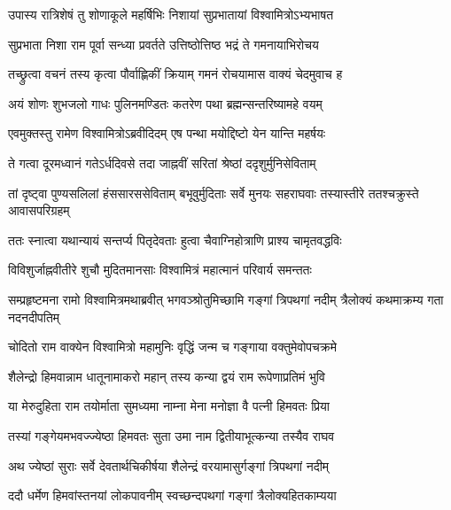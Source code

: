 
\twolineshloka
{उपास्य रात्रिशेषं तु शोणाकूले महर्षिभिः}
{निशायां सुप्रभातायां विश्वामित्रोऽभ्यभाषत} %

\twolineshloka
{सुप्रभाता निशा राम पूर्वा सन्ध्या प्रवर्तते}
{उत्तिष्ठोत्तिष्ठ भद्रं ते गमनायाभिरोचय} %

\twolineshloka
{तच्छ्रुत्वा वचनं तस्य कृत्वा पौर्वाह्णिकीं क्रियाम्}
{गमनं रोचयामास वाक्यं चेदमुवाच ह} %

\twolineshloka
{अयं शोणः शुभजलो गाधः पुलिनमण्डितः}
{कतरेण पथा ब्रह्मन्सन्तरिष्यामहे वयम्} %

\twolineshloka
{एवमुक्तस्तु रामेण विश्वामित्रोऽब्रवीदिदम्}
{एष पन्था मयोद्दिष्टो येन यान्ति महर्षयः} %

\twolineshloka
{ते गत्वा दूरमध्वानं गतेऽर्धदिवसे तदा}
{जाह्नवीं सरितां श्रेष्ठां ददृशुर्मुनिसेविताम्} %

\threelineshloka
{तां दृष्ट्वा पुण्यसलिलां हंससारससेविताम्}
{बभूवुर्मुदिताः सर्वे मुनयः सहराघवाः}
{तस्यास्तीरे ततश्चक्रुस्ते आवासपरिग्रहम्} %

\twolineshloka
{ततः स्नात्वा यथान्यायं सन्तर्प्य पितृदेवताः}
{हुत्वा चैवाग्निहोत्राणि प्राश्य चामृतवद्धविः} %

\twolineshloka
{विविशुर्जाह्नवीतीरे शुचौ मुदितमानसाः}
{विश्वामित्रं महात्मानं परिवार्य समन्ततः} %

\threelineshloka
{सम्प्रहृष्टमना रामो विश्वामित्रमथाब्रवीत्}
{भगवञ्श्रोतुमिच्छामि गङ्गां त्रिपथगां नदीम्}
{त्रैलोक्यं कथमाक्रम्य गता नदनदीपतिम्} %

\twolineshloka
{चोदितो राम वाक्येन विश्वामित्रो महामुनिः}
{वृद्धिं जन्म च गङ्गाया वक्तुमेवोपचक्रमे} %

\twolineshloka
{शैलेन्द्रो हिमवान्नाम धातूनामाकरो महान्}
{तस्य कन्या द्वयं राम रूपेणाप्रतिमं भुवि} %

\twolineshloka
{या मेरुदुहिता राम तयोर्माता सुमध्यमा}
{नाम्ना मेना मनोज्ञा वै पत्नी हिमवतः प्रिया} %

\twolineshloka
{तस्यां गङ्गेयमभवज्ज्येष्ठा हिमवतः सुता}
{उमा नाम द्वितीयाभूत्कन्या तस्यैव राघव} %

\twolineshloka
{अथ ज्येष्ठां सुराः सर्वे देवतार्थचिकीर्षया}
{शैलेन्द्रं वरयामासुर्गङ्गां त्रिपथगां नदीम्} %

\twolineshloka
{ददौ धर्मेण हिमवांस्तनयां लोकपावनीम्}
{स्वच्छन्दपथगां गङ्गां त्रैलोक्यहितकाम्यया} %

